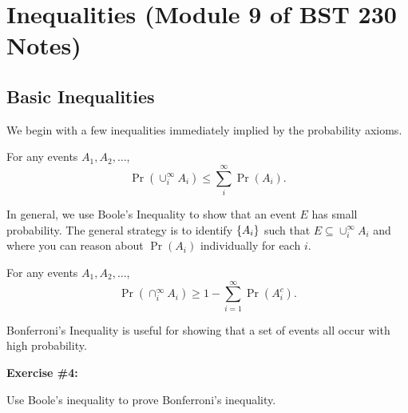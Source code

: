 \section{Inequalities (Module 9 of BST 230 Notes)}

\subsection{Basic Inequalities}

We begin with a few inequalities immediately 
implied by the probability axioms.

\begin{theorem}
    \label{thm:union_bound}
    For any events $A_1, A_2, \hdots$,
    \[
        \Pr \left( \cup_i^{\infty} A_i \right)
        \leq
        \sum_i^{\infty} \Pr(A_i).
    \]
\end{theorem}

In general, we use Boole's Inequality to show that an event $E$ has 
small probability. The general strategy is to identify $\{A_i\}$
such that $E \subseteq \cup_i^{\infty} A_i$ and where you can 
reason about $\Pr(A_i)$ individually for each $i$.

\begin{theorem}
    \label{thm:bonferroni_inequality}
    For any events $A_1, A_2, \hdots$,
    \[
        \Pr \left( \cap_i^{\infty} A_i \right)
        \geq 
        1 - \sum_{i=1}^{\infty} \Pr(A_i^c).
    \]
\end{theorem}

Bonferroni's Inequality is useful for showing that a 
set of events all occur with high probability.

\begin{tcolorbox}
    \textbf{Exercise \#4:}

    Use Boole's inequality to prove Bonferroni's inequality.
\end{tcolorbox}


